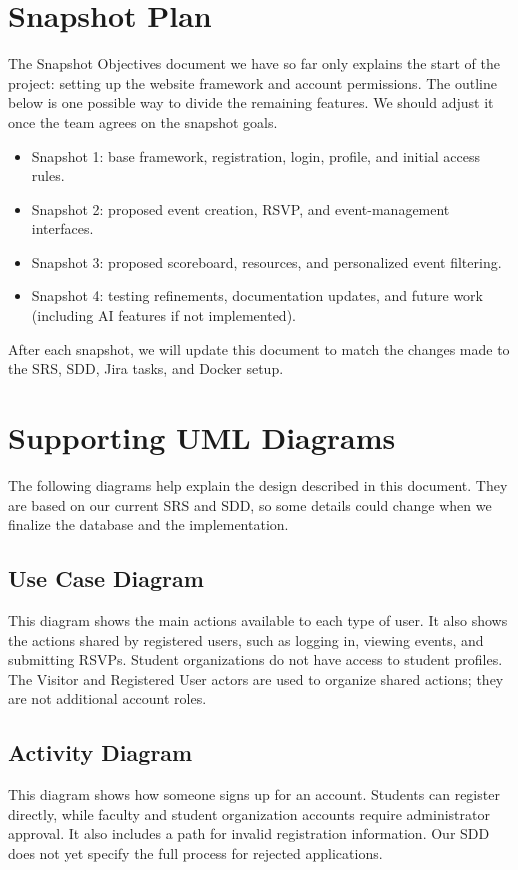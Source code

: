 \documentclass[11pt,letterpaper]{article}
\begin{document}
\section{Snapshot Plan}
The Snapshot Objectives document we have so far only explains the start of the project: setting up the website framework and account permissions. The outline below is one possible way to divide the remaining features. We should adjust it once the team agrees on the snapshot goals.
\begin{itemize}
\item Snapshot 1: base framework, registration, login, profile, and initial access rules.
\item Snapshot 2: proposed event creation, RSVP, and event-management interfaces.
\item Snapshot 3: proposed scoreboard, resources, and personalized event filtering.
\item Snapshot 4: testing refinements, documentation updates, and future work (including AI features if not implemented).
\end{itemize}
After each snapshot, we will update this document to match the changes made to the SRS, SDD, Jira tasks, and Docker setup.


\section{Supporting UML Diagrams}
The following diagrams help explain the design described in this document. They are based on our current SRS and SDD, so some details could change when we finalize the database and the implementation.

\subsection{Use Case Diagram}
This diagram shows the main actions available to each type of user. It also shows the actions shared by registered users, such as logging in, viewing events, and submitting RSVPs. Student organizations do not have access to student profiles. The Visitor and Registered User actors are used to organize shared actions; they are not additional account roles.

\subsection{Activity Diagram}
This diagram shows how someone signs up for an account. Students can register directly, while faculty and student organization accounts require administrator approval. It also includes a path for invalid registration information. Our SDD does not yet specify the full process for rejected applications.
\end{document}
